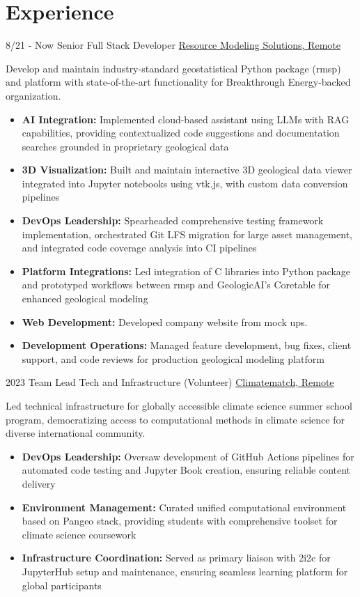 \documentclass[]{friggeri-cv}
\begin{document}
\section{Experience}
\begin{entrylist}
	
	\entry
	{8/21 - Now}
	{Senior Full Stack Developer}
	{\href{https://resourcemodelingsolutions.com/}{Resource Modeling Solutions, Remote}}
	{
	Develop and maintain industry-standard geostatistical Python package (rmsp) and platform with state-of-the-art functionality for Breakthrough Energy-backed organization.
	\\[-0.5em]
	\begin{itemize}[label={}, itemsep=3pt, leftmargin=0pt]
		\item \textbf{AI Integration:} Implemented cloud-based assistant using LLMs with RAG capabilities, providing contextualized code suggestions and documentation searches grounded in proprietary geological data
		\item \textbf{3D Visualization:} Built and maintain interactive 3D geological data viewer integrated into Jupyter notebooks using vtk.js, with custom data conversion pipelines
		\item \textbf{DevOps Leadership:} Spearheaded comprehensive testing framework implementation, orchestrated Git LFS migration for large asset management, and integrated code coverage analysis into CI pipelines
		\item \textbf{Platform Integrations:} Led integration of C libraries into Python package and prototyped workflows between rmsp and GeologicAI's Coretable for enhanced geological modeling
		\item \textbf{Web Development:} Developed company website from mock ups.
		\item \textbf{Development Operations:} Managed feature development, bug fixes, client support, and code reviews for production geological modeling platform
	\end{itemize}
	}

	\entry
	{2023}
	{Team Lead Tech and Infrastructure (Volunteer)}
	{\href{https://sites.google.com/climatematch.io/academy/about}{Climatematch, Remote}}
	{
		Led technical infrastructure for globally accessible climate science summer school program, democratizing access to computational methods in climate science for diverse international community.
		\\[-0.5em]
		\begin{itemize}[label={}, itemsep=3pt, leftmargin=0pt]
			\item \textbf{DevOps Leadership:} Oversaw development of GitHub Actions pipelines for automated code testing and Jupyter Book creation, ensuring reliable content delivery
			\item \textbf{Environment Management:} Curated unified computational environment based on Pangeo stack, providing students with comprehensive toolset for climate science coursework
			\item \textbf{Infrastructure Coordination:} Served as primary liaison with 2i2c for JupyterHub setup and maintenance, ensuring seamless learning platform for global participants
		\end{itemize}
	}
  \end{entrylist}
\end{document}
